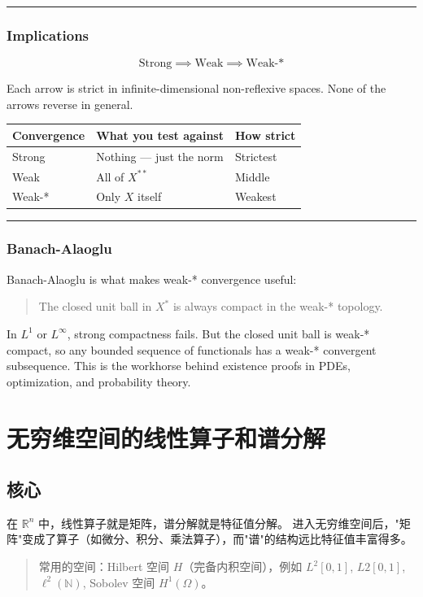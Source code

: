 \hrule

\subsubsection{Implications}

\[
\text{Strong} \implies \text{Weak} \implies \text{Weak-*}
\]

Each arrow is strict in infinite-dimensional non-reflexive spaces. None of the arrows reverse in general.

\begin{center}
\begin{tabular}{lll}
\toprule
Convergence & What you test against & How strict \\
\midrule
Strong & Nothing — just the norm & Strictest \\
Weak & All of \(X^{**}\) & Middle \\
Weak-* & Only \(X\) itself & Weakest \\
\bottomrule
\end{tabular}
\end{center}

\hrule

\subsubsection{Banach-Alaoglu}

Banach-Alaoglu is what makes weak-* convergence useful:

\begin{quote}
The closed unit ball in \(X^*\) is always compact in the weak-* topology.
\end{quote}

In \(L^1\) or \(L^\infty\), strong compactness fails. But the closed unit ball is weak-* compact, so any bounded sequence of functionals has a weak-* convergent subsequence. This is the workhorse behind existence proofs in PDEs, optimization, and probability theory.

\section{无穷维空间的线性算子和谱分解}

\subsection{核心}

在 \(\mathbb{R}^n\) 中，线性算子就是矩阵，谱分解就是特征值分解。
进入无穷维空间后，"矩阵"变成了算子（如微分、积分、乘法算子），而"谱"的结构远比特征值丰富得多。

\begin{quote}
常用的空间：Hilbert 空间 \(H\)（完备内积空间），例如 \(L^2[0,1]\), \(L2[0,1]\), \(\ell^2(\mathbb{N})\), Sobolev 空间 \(H^1(\Omega)\)。
\end{quote}
